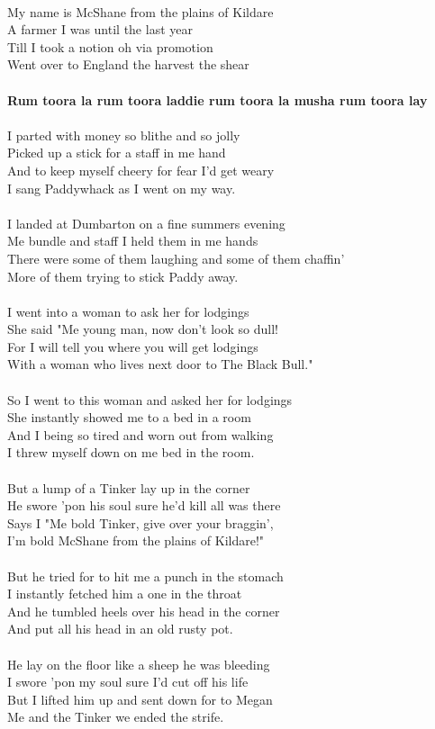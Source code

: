 \documentclass[letterpaper,14pt]{extarticle}
\begin{document}
\noindent
\\My name is McShane from the plains of Kildare
\\A farmer I was until the last year
\\Till I took a notion oh via promotion
\\Went over to England the harvest the shear
\\
\\\textbf{Rum toora la rum toora laddie rum toora la musha rum toora lay}
\\
\\I parted with money so blithe and so jolly
\\Picked up a stick for a staff in me hand
\\And to keep myself cheery for fear I'd get weary
\\I sang Paddywhack as I went on my way.
\\
\\I landed at Dumbarton on a fine summers evening
\\Me bundle and staff I held them in me hands
\\There were some of them laughing and some of them chaffin'
\\More of them trying to stick Paddy away.
\\
\\I went into a woman to ask her for lodgings
\\She said "Me young man, now don't look so dull!
\\For I will tell you where you will get lodgings
\\With a woman who lives next door to The Black Bull."
\\
\\So I went to this woman and asked her for lodgings
\\She instantly showed me to a bed in a room
\\And I being so tired and worn out from walking
\\I threw myself down on me bed in the room.
\\
\\But a lump of a Tinker lay up in the corner
\\He swore 'pon his soul sure he'd kill all was there
\\Says I "Me bold Tinker, give over your braggin',
\\I'm bold McShane from the plains of Kildare!"
\\
\\But he tried for to hit me a punch in the stomach
\\I instantly fetched him a one in the throat
\\And he tumbled heels over his head in the corner
\\And put all his head in an old rusty pot.
\\
\\He lay on the floor like a sheep he was bleeding
\\I swore 'pon my soul sure I'd cut off his life
\\But I lifted him up and sent down for to Megan
\\Me and the Tinker we ended the strife.
\end{document}
